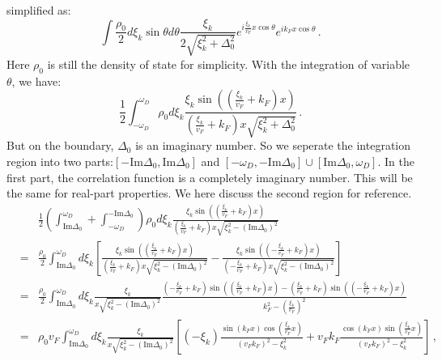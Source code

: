 \documentclass[aps,onecolumn,nofootinbib,superscriptaddress,notitlepage,longbibliography]{revtex4-1}
\begin{document}
simplified as: 
\begin{equation}
\int\frac{\rho_{0}}{2}d\xi_{k}\sin\theta d\theta\frac{\xi_{k}}{2\sqrt{\xi_{k}^{2}+\Delta_{0}^{2}}}e^{i\frac{\xi_{k}}{v_{F}}x\cos\theta}e^{ik_{F}x\cos\theta}\,.
\end{equation}
Here $\rho_{0}$ is still the density of state for simplicity. With
the integration of variable $\theta$, we have: 
\begin{equation}
\frac{1}{2}\int_{-\omega_{D}}^{\omega_{D}}\rho_{0}d\xi_{k}\frac{\xi_{k}\sin\left(\left(\frac{\xi_{k}}{v_{F}}+k_{F}\right)x\right)}{\left(\frac{\xi_{k}}{v_{F}}+k_{F}\right)x\sqrt{\xi_{k}^{2}+\Delta_{0}^{2}}}\,.
\end{equation}
But on the boundary, $\Delta_{0}$ is an imaginary number. So we seperate
the integration region into two parts:$\left[-\text{Im}\Delta_{0},\text{Im}\Delta_{0}\right]$
and $\left[-\omega_{D},-\text{Im}\Delta_{0}\right]\cup\left[\text{Im}\Delta_{0},\omega_{D}\right]$.
In the first part, the correlation function is a completely imaginary
number. This will be the same for real-part properties. We here discuss
the second region for reference. 
\begin{eqnarray}
 &  & \frac{1}{2}\left(\int_{\text{Im}\Delta_{0}}^{\omega_{D}}+\int_{-\omega_{D}}^{-\text{Im}\Delta_{0}}\right)\rho_{0}d\xi_{k}\frac{\xi_{k}\sin\left(\left(\frac{\xi_{k}}{v_{F}}+k_{F}\right)x\right)}{\left(\frac{\xi_{k}}{v_{F}}+k_{F}\right)x\sqrt{\xi_{k}^{2}-\left(\text{Im}\Delta_{0}\right)^{2}}}\nonumber \\
 & = & \frac{\rho_{0}}{2}\int_{\text{Im}\Delta_{0}}^{\omega_{D}}d\xi_{k}\left[\frac{\xi_{k}\sin\left(\left(\frac{\xi_{k}}{v_{F}}+k_{F}\right)x\right)}{\left(\frac{\xi_{k}}{v_{F}}+k_{F}\right)x\sqrt{\xi_{k}^{2}-\left(\text{Im}\Delta_{0}\right)^{2}}}-\frac{\xi_{k}\sin\left(\left(-\frac{\xi_{k}}{v_{F}}+k_{F}\right)x\right)}{\left(-\frac{\xi_{k}}{v_{F}}+k_{F}\right)x\sqrt{\xi_{k}^{2}-\left(\text{Im}\Delta_{0}\right)^{2}}}\right]\nonumber \\
 & = & \frac{\rho_{0}}{2}\int_{\text{Im}\Delta_{0}}^{\omega_{D}}d\xi_{k}\frac{\xi_{k}}{x\sqrt{\xi_{k}^{2}-\left(\text{Im}\Delta_{0}\right)^{2}}}\frac{\left(-\frac{\xi_{k}}{v_{F}}+k_{F}\right)\sin\left(\left(\frac{\xi_{k}}{v_{F}}+k_{F}\right)x\right)-\left(\frac{\xi_{k}}{v_{F}}+k_{F}\right)\sin\left(\left(-\frac{\xi_{k}}{v_{F}}+k_{F}\right)x\right)}{k_{F}^{2}-\left(\frac{\xi_{k}}{v_{F}}\right)^{2}}\nonumber \\
 & = & \rho_{0}v_{F}\int_{\text{Im}\Delta_{0}}^{\omega_{D}}d\xi_{k}\frac{\xi_{k}}{x\sqrt{\xi_{k}^{2}-\left(\text{Im}\Delta_{0}\right)^{2}}}\left[(-\xi_{k})\frac{\sin(k_{F}x)\cos\left(\frac{\xi_{k}}{v_{F}}x\right)}{(v_{F}k_{F})^{2}-\xi_{k}^{2}}+v_{F}k_{F}\frac{\cos(k_{F}x)\sin\left(\frac{\xi_{k}}{v_{F}}x\right)}{(v_{F}k_{F})^{2}-\xi_{k}^{2}}\right]\,,
\end{eqnarray}
\end{document}
